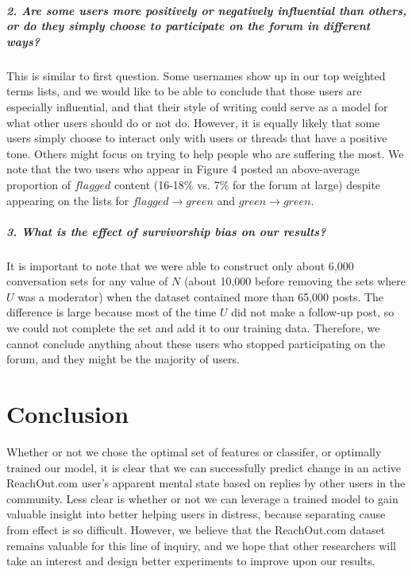 \documentclass{article}
\begin{document}
\subparagraph{2. Are some users more positively or negatively influential than others, or do they simply choose to participate on the forum in different ways?}This is similar to first question. Some usernames show up in our top weighted terms lists, and we would like to be able to conclude that those users are especially influential, and that their style of writing could serve as a model for what other users should do or not do. However, it is equally likely that some users simply choose to interact only with users or threads that have a positive tone. Others might focus on trying to help people who are suffering the most. We note that the two users who appear in Figure 4 posted an above-average proportion of $flagged$ content (16-18\% vs. 7\% for the forum at large) despite appearing on the lists for $flagged \rightarrow green$ and $green \rightarrow green$.

\subparagraph{3. What is the effect of survivorship bias on our results?}It is important to note that we were able to construct only about 6,000 conversation sets for any value of $N$ (about 10,000 before removing the sets where $U$ was a moderator) when the dataset contained more than 65,000 posts. The difference is large because most of the time $U$ did not make a follow-up post, so we could not complete the set and add it to our training data. Therefore, we cannot conclude anything about these users who stopped participating on the forum, and they might be the majority of users.

\section{Conclusion}Whether or not we chose the optimal set of features or classifer, or optimally trained our model, it is clear that we can successfully predict change in an active ReachOut.com user's apparent mental state based on replies by other users in the community. Less clear is whether or not we can leverage a trained model to gain valuable insight into better helping users in distress, because separating cause from effect is so difficult. However, we believe that the ReachOut.com dataset remains valuable for this line of inquiry, and we hope that other researchers will take an interest and design better experiments to improve upon our results.
\end{document}
